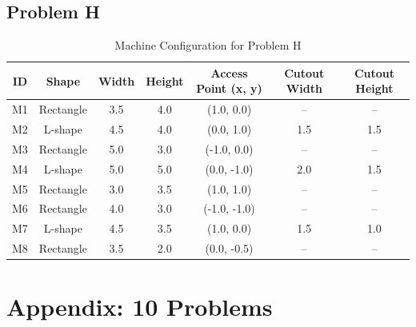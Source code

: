 \subsection{Problem H}
\begin{table}[H]
\centering
\small
\begin{tabular}{ccccccc}
\toprule
\textbf{ID} & \textbf{Shape} & \textbf{Width} & \textbf{Height} & \textbf{Access Point (x, y)} & \textbf{Cutout Width} & \textbf{Cutout Height} \\
\midrule
M1 & Rectangle & 3.5 & 4.0 & (1.0, 0.0)   & --   & --   \\
M2 & L-shape   & 4.5 & 4.0 & (0.0, 1.0)   & 1.5  & 1.5  \\
M3 & Rectangle & 5.0 & 3.0 & (-1.0, 0.0)  & --   & --   \\
M4 & L-shape   & 5.0 & 5.0 & (0.0, -1.0)  & 2.0  & 1.5  \\
M5 & Rectangle & 3.0 & 3.5 & (1.0, 1.0)   & --   & --   \\
M6 & Rectangle & 4.0 & 3.0 & (-1.0, -1.0) & --   & --   \\
M7 & L-shape   & 4.5 & 3.5 & (1.0, 0.0)   & 1.5  & 1.0  \\
M8 & Rectangle & 3.5 & 2.0 & (0.0, -0.5)  & --   & --   \\
\bottomrule
\end{tabular}
\caption{Machine Configuration for Problem H}
\label{tab:machine_config_h}
\end{table}

\newpage
\section{Appendix: 10 Problems}
